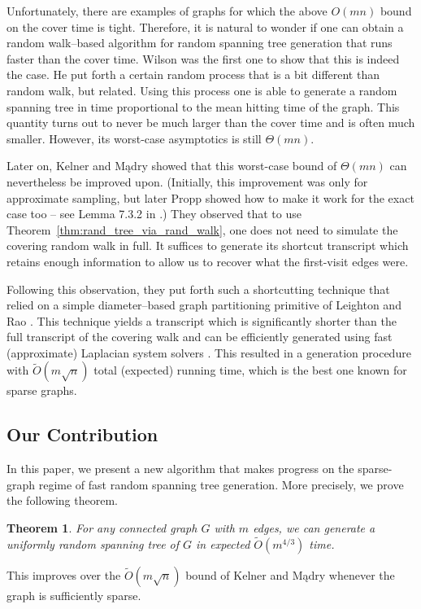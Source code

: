 \documentclass[11pt, letterpaper]{article}
\newtheorem{theorem}{Theorem}[section]
\newcommand{\tO}{\widetilde{O}}
\begin{document}
Unfortunately, there are examples of graphs for which the above $O(mn)$ bound on the cover time is tight. Therefore, it is natural to wonder if one can obtain a random walk--based algorithm for random spanning tree generation that runs faster than the cover time. Wilson \cite{Wilson96} was the first one to show that this is indeed the case. He put forth a certain random process that is a bit different than random walk, but related. Using this process one is able to generate a random spanning tree in time proportional to the mean hitting time of the graph. This quantity turns out to never be much larger than the cover time and is often much smaller. However, its worst-case asymptotics is still $\Theta(mn)$.

Later on,  Kelner and Mądry \cite{KelnerM09} showed that this worst-case bound of $\Theta(mn)$ can nevertheless be improved upon. (Initially, this improvement was only for approximate sampling, but later Propp \cite{Propp10} showed how to make it work for the exact case too -- see Lemma 7.3.2 in \cite{Madry11}.) They observed that to use Theorem~\ref{thm:rand_tree_via_rand_walk}, one does not need to simulate the covering random walk in full. It suffices to generate its shortcut transcript which retains enough information to allow us to recover what the first-visit edges were. 

 Following this observation, they put forth such a shortcutting technique that relied on a simple diameter--based graph partitioning primitive of Leighton and Rao \cite{LeightonR99}. This technique yields a transcript which is significantly shorter than the full transcript of the covering walk and can be efficiently generated using fast (approximate) Laplacian system solvers \cite{SpielmanT03,SpielmanT04,KoutisMP10,KoutisMP11,KelnerOSZ13}.  This resulted in a generation procedure with $\tO(m\sqrt{n})$ total (expected) running time, which is the best one known for sparse graphs.


\subsection{Our Contribution}

In this paper, we present a new algorithm that makes progress on the sparse-graph regime of fast random spanning tree generation. More precisely, we prove the following theorem. 

\begin{theorem}
\label{thm:main}
For any connected graph $G$ with $m$ edges, we can generate a uniformly random spanning tree of $G$ in expected $\tO(m^{4/3})$ time.
\end{theorem}
This improves over the $\tO(m\sqrt{n})$ bound of Kelner and Mądry \cite{KelnerM09} whenever the graph is sufficiently sparse.
\end{document}
